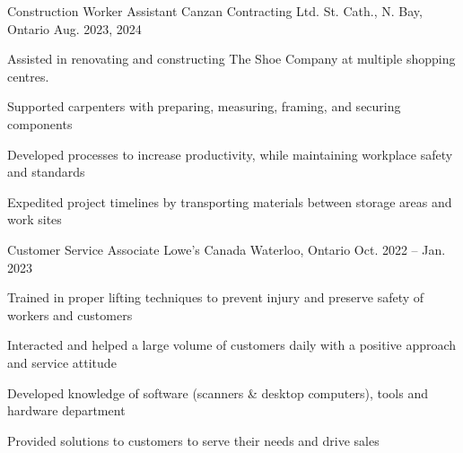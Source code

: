 

\begin{cventries}
  \cventry
    {Construction Worker Assistant} %
    {Canzan Contracting Ltd.} %
    {St. Cath., N. Bay, Ontario} %
    {Aug. 2023, 2024} %
    {
      \begin{cvitems} %
        \item {Assisted in renovating and constructing The Shoe Company at multiple shopping centres.}
        \item {Supported carpenters with preparing, measuring, framing, and securing components}
        \item {Developed processes to increase productivity, while maintaining workplace safety and standards}
        \item {Expedited project timelines by transporting materials between storage areas and work sites}
      \end{cvitems}
    }

  \cventry
    {Customer Service Associate} %
    {Lowe's Canada} %
    {Waterloo, Ontario} %
    {Oct. 2022 -- Jan. 2023} %
    {
      \begin{cvitems} %
        \item{Trained in proper lifting techniques to prevent injury and preserve safety of workers and customers}
        \item {Interacted and helped a large volume of customers daily with a positive approach and service attitude}
        \item {Developed knowledge of software (scanners \& desktop computers), tools and hardware department}
        \item {Provided solutions to customers to serve their needs and drive sales}
      \end{cvitems}
    }


    \vspace{5mm}


\end{cventries}
